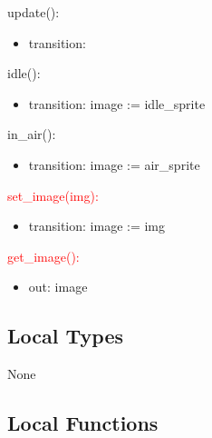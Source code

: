\documentclass[12pt]{article}
\begin{document}
update():
\begin{itemize}
    \item transition:
\end{itemize}

idle():
\begin{itemize}
    \item transition: image := idle\_sprite
\end{itemize}

in\_air():
\begin{itemize}
    \item transition: image := air\_sprite
\end{itemize}

\textcolor{red}{set\_image(img):}
\begin{itemize}
    \item \color{red}transition: image := img
\end{itemize}

\textcolor{red}{get\_image():}
\begin{itemize}
    \item \color{red}out: image
\end{itemize}

\subsection* {Local Types}

None

\subsection* {Local Functions}
\end{document}
